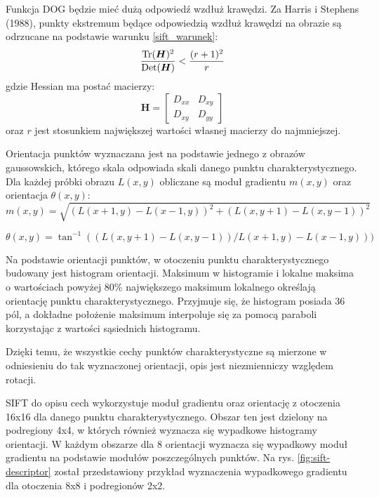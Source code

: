 Funkcja DOG będzie mieć dużą odpowiedź wzdłuż krawędzi. Za Harris i Stephens (1988), punkty ekstremum będące odpowiedzią wzdłuż krawędzi na obrazie są odrzucane na podstawie warunku \ref{sift_warunek}:
\begin{equation} 
\label{sift_warunek} 
\frac{\operatorname{Tr}(\boldsymbol{H})^2}{\operatorname{Det}(\boldsymbol{H})} < \frac{(r+1)^2}{r}
\end{equation} gdzie Hessian ma postać macierzy:
\begin{equation} 
\label{sift_hessian} 
\boldsymbol{H} = 
	\begin{bmatrix}
		D_{xx} & D_{xy} \\
		D_{xy} & D_{yy}
	\end{bmatrix}
\end{equation} oraz $r$ jest stosunkiem największej wartości własnej macierzy do najmniejszej.

Orientacja punktów wyznaczana jest na podstawie jednego z obrazów gaussowskich, którego skala odpowiada skali danego punktu charakterystycznego. Dla każdej próbki obrazu $L(x, y)$ obliczane są moduł gradientu $m(x, y)$ oraz orientacja $\theta(x, y)$:
\begin{equation} 
\label{sift_gradient_magnitude} 
m(x, y) = \sqrt{(L(x + 1, y) - L(x - 1, y))^2 + (L(x, y + 1) - L(x, y - 1))^2}
\end{equation}

\begin{equation} 
\label{sift_orientation} 
\theta(x, y) = \tan^{-1}((L(x, y + 1) - L(x, y - 1))/L(x + 1, y) - L(x - 1, y)))
\end{equation}

Na podstawie orientacji punktów, w otoczeniu punktu charakterystycznego budowany jest histogram orientacji. Maksimum w histogramie i lokalne maksima o wartościach powyżej 80\% największego maksimum lokalnego określają orientację punktu charakterystycznego. Przyjmuje się, że histogram posiada 36 pól, a dokładne położenie maksimum interpoluje się za pomocą paraboli korzystając z wartości sąsiednich histogramu.

Dzięki temu, że wszystkie cechy punktów charakterystyczne są mierzone w odniesieniu do tak wyznaczonej orientacji, opis jest niezmienniczy względem rotacji.

SIFT do opisu cech wykorzystuje moduł gradientu oraz orientację z otoczenia 16x16 dla danego punktu charakterystycznego. Obszar ten jest dzielony na podregiony 4x4, w których również wyznacza się wypadkowe histogramy orientacji. W każdym obszarze dla 8 orientacji wyznacza się wypadkowy moduł gradientu na podstawie modułów poszczególnych punktów. Na rys. \ref{fig:sift-descriptor} został przedstawiony przykład wyznaczenia wypadkowego gradientu dla otoczenia 8x8 i podregionów 2x2.

